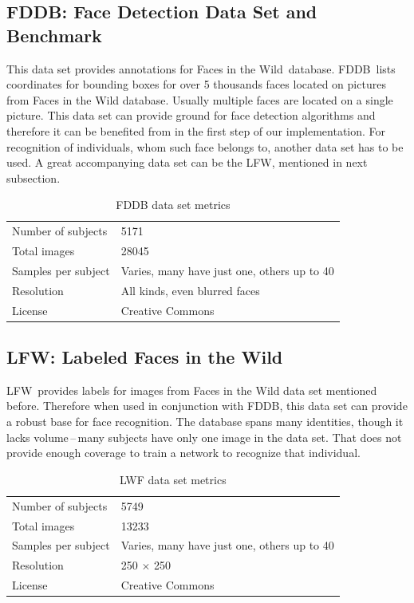 \subsection{FDDB: Face Detection Data Set and Benchmark}

This data set provides annotations for Faces in the Wild\,\cite{fiw} database. FDDB\,\cite{fddb} lists coordinates for bounding boxes for over 5 thousands faces located on pictures from Faces in the Wild database. Usually multiple faces are located on a single picture. This data set can provide ground for face detection algorithms and therefore it can be benefited from in the first step of our implementation. For recognition of individuals, whom such face belongs to, another data set has to be used. A great accompanying data set can be the LFW, mentioned in next subsection.

\begin{table}[ht]
    \centering
    \begin{tabularx}{.8\textwidth}{l|X}
        \toprule
        Number of subjects & \num{5171} \\
        Total images &  \num{28045} \\
        Samples per subject & Varies, many have just one, others up to 40 \\
        Resolution & All kinds, even blurred faces \\
        License & Creative Commons \\
        \bottomrule
    \end{tabularx}
    \caption{FDDB data set metrics}
\end{table}

\subsection{LFW: Labeled Faces in the Wild}
\label{ss:lfw}

LFW\,\cite{lfw} provides labels for images from Faces in the Wild data set mentioned before. Therefore when used in conjunction with FDDB, this data set can provide a robust base for face recognition. The database spans many identities, though it lacks volume\,--\,many subjects have only one image in the data set. That does not provide enough coverage to train a network to recognize that individual.

\begin{table}[ht]
    \centering
    \begin{tabularx}{.8\textwidth}{l|X}
        \toprule
        Number of subjects & \num{5749} \\
        Total images & \num{13233} \\
        Samples per subject & Varies, many have just one, others up to 40 \\
        Resolution & 250 $\times$ 250 \\
        License & Creative Commons \\
        \bottomrule
    \end{tabularx}
    \caption{LWF data set metrics}
\end{table}

